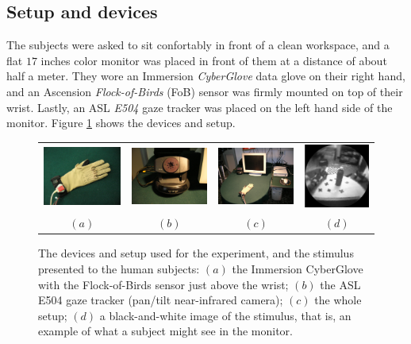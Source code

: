 \documentclass[jou,a4paper,notxfonts]{apa}
\begin{document}
\subsection{Setup and devices}

The subjects were asked to sit confortably in front of a clean
workspace, and a flat $17$ inches color monitor was placed in front of
them at a distance of about half a meter. They wore an Immersion
\emph{CyberGlove} data glove \cite{cyberglove} on their right hand,
and an Ascension \emph{Flock-of-Birds} (FoB) \cite{fob} sensor was
firmly mounted on top of their wrist. Lastly, an ASL \emph{E504} gaze
tracker \cite{e504} was placed on the left hand side of the
monitor. Figure \ref{fig:devices} shows the devices and setup.

\begin{figure}[ht]
  \centering
    \begin{tabular}{cccc}
      \includegraphics[width=0.24\linewidth]{figs/glove.eps} &
      \includegraphics[width=0.24\linewidth]{figs/e504.eps} &
      \includegraphics[width=0.24\linewidth]{figs/setup.eps} &
      \includegraphics[height=0.18\linewidth]{figs/stimulus.eps} \\
      $(a)$ & $(b)$ & $(c)$ & $(d)$ \\
    \end{tabular}
    \caption{The devices and setup used for the experiment, and
    the stimulus presented to the human subjects: $(a)$ the
    Immersion CyberGlove with the Flock-of-Birds sensor just above the
    wrist; $(b)$ the ASL E504 gaze tracker (pan/tilt near-infrared
    camera); $(c)$ the whole setup; $(d)$ a black-and-white image
    of the stimulus, that is, an example of what a subject might
    see in the monitor.}
    \label{fig:devices}
\end{figure}
\end{document}
